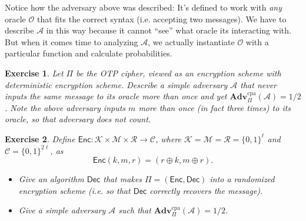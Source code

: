 \documentclass[11pt]{article}
\newtheorem{exercise}{Exercise}
\newcommand{\msgs}{\mathcal{M}}
\newcommand{\ctxts}{\mathcal{C}}
\newcommand{\keys}{\mathcal{K}}
\newcommand{\rands}{\mathcal{R}}
\newcommand{\Enc}{\mathsf{Enc}}
\newcommand{\Dec}{\mathsf{Dec}}
\newcommand{\calA}{\mathcal{A}}
\newcommand{\calO}{\mathcal{O}}
\newcommand{\Adv}{\mathbf{Adv}}
\newcommand{\AdvCPA}[2]{\Adv^{\mathrm{cpa}}_{#1}({#2})}
\newcommand{\bits}{\{0,1\}}
\begin{document}
Notice how the adversary above was described: It's defined to work with
\emph{any} oracle $\calO$ that fits the correct syntax (i.e. accepting two
messages). We have to describe $\calA$ in this way because it cannot ``see''
what oracle its interacting with. But when it comes time to analyzing $\calA$,
we actually instantiate $\calO$ with a particular function and calculate
probabilities.

\begin{exercise}
    Let $\Pi$ be the OTP cipher, viewed as an encryption scheme with
    deterministic encryption scheme. Describe a simple adversary $\calA$
    that never inputs the same message to its oracle more than once and yet
    $\AdvCPA{\Pi}{\calA} = 1/2$. Note the above adversary inputs $m$
    more than once (in fact three times) to its oracle, so that adversary
    does not count.
\end{exercise}

\begin{exercise}
    Define $\Enc:\keys\times\msgs\times\rands\to\ctxts$, where 
    $\keys=\msgs=\rands=\bits^\ell$ and $\ctxts = \bits^{2\ell}$, 
    as
    \[
        \Enc(k,m,r) = (r\oplus k, m\oplus r).
    \]
    \begin{itemize}

        \item Give an algorithm $\Dec$ that makes $\Pi = (\Enc,\Dec)$ into a
            randomized encryption scheme (i.e. so that $\Dec$ correctly
            recovers the message).

        \item Give a simple adversary $\calA$ such that $\AdvCPA{\Pi}{\calA} =
            1/2$.

    \end{itemize}

\end{exercise}
\end{document}
